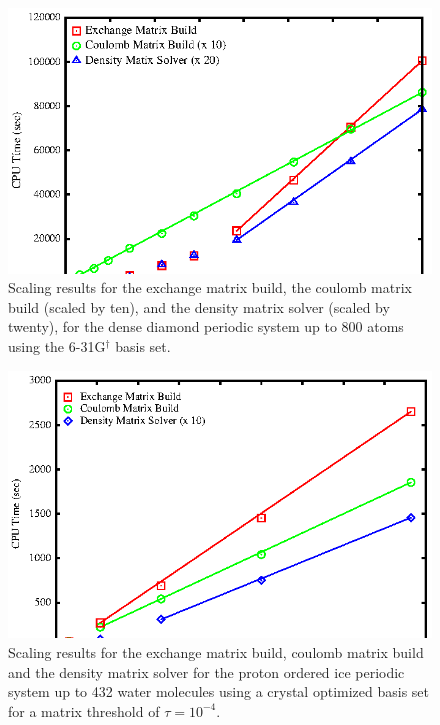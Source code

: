 \documentclass[prb,aps,nobibnotes,twocolumn,doublespace,twocolumngrid,superbib]{revtex4}
\begin{document}
\begin{figure}
\caption{Scaling results for the exchange matrix build, the coulomb matrix
build (scaled by ten), and the density matrix solver (scaled by twenty),  
for the dense diamond periodic system up to 800 atoms using the
6-31G$ ^\dagger$ basis set.}
\label{figure:Scaling_Matrix_Build}
{\centering \includegraphics{Timing_Diamond_ONX.ps} \par} 
\end{figure}
%
\begin{figure}
\caption{Scaling results for the exchange matrix build, coulomb matrix
build and the density matrix solver  for the proton ordered ice periodic system up to 432 water molecules 
using a crystal optimized basis set\cite{CBS:511G:H,CBS:861G:MgO} for a matrix threshold of $\tau=10^{-4}$.}
\label{figure:Scaling_Matrix_Build_Ice}
{\centering \includegraphics{Timing_pIce_ONX_1.ps} \par} 
\end{figure}
\end{document}
